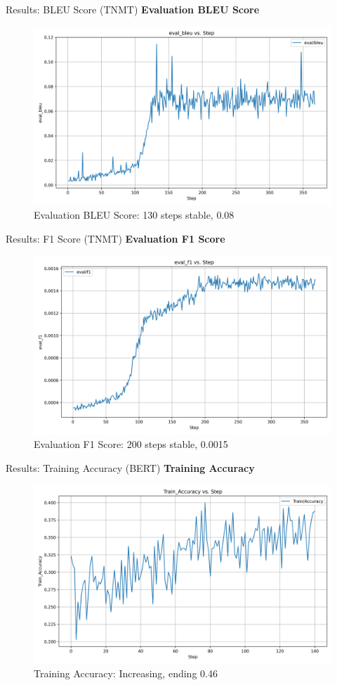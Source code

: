 \documentclass[aspectratio=169]{beamer}
\begin{document}
\begin{frame}{Results: BLEU Score (TNMT)}
  \textbf{Evaluation BLEU Score}
  \begin{figure}
    \centering
    \includegraphics[width=0.6\linewidth]{Transformer_eval_bleu.png}
    \caption{\small Evaluation BLEU Score: 130 steps stable, 0.08}
  \end{figure}
\end{frame}

\begin{frame}{Results: F1 Score (TNMT)}
  \textbf{Evaluation F1 Score}
  \begin{figure}
    \centering
    \includegraphics[width=0.6\linewidth]{Transformer_eval_f1.png}
    \caption{\small Evaluation F1 Score: 200 steps stable, 0.0015}
  \end{figure}
\end{frame}

\begin{frame}{Results: Training Accuracy (BERT)}
  \textbf{Training Accuracy}
  \begin{figure}
    \centering
    \includegraphics[width=0.6\linewidth]{BERT_Train_Accuracy.png}
    \caption{\small Training Accuracy: Increasing, ending 0.46}
  \end{figure}
\end{frame}
\end{document}
